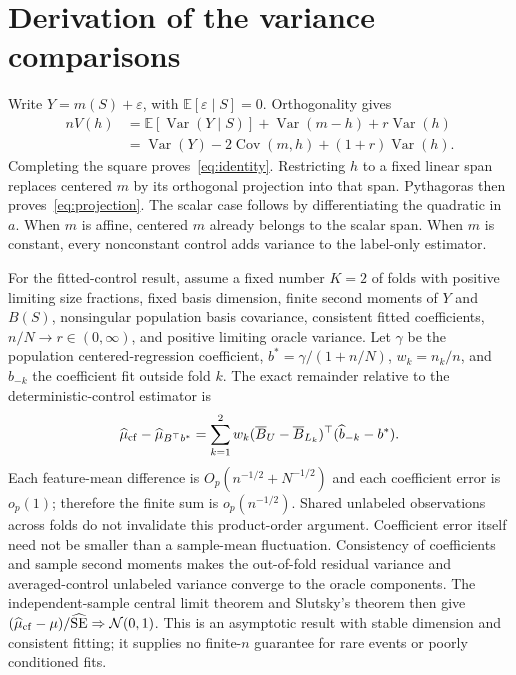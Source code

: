\appendix
\section{Derivation of the variance comparisons}
Write $Y=m(S)+\varepsilon$, with $\mathbb E[\varepsilon\mid S]=0$. Orthogonality gives
\begin{align*}
 nV(h)&=\mathbb E[\operatorname{Var}(Y\mid S)]
       +\operatorname{Var}(m-h)+r\operatorname{Var}(h)\\
 &=\operatorname{Var}(Y)-2\operatorname{Cov}(m,h)
       +(1+r)\operatorname{Var}(h).
\end{align*}
Completing the square proves~\eqref{eq:identity}. Restricting $h$ to a fixed linear span replaces centered $m$ by its orthogonal projection into that span. Pythagoras then proves~\eqref{eq:projection}. The scalar case follows by differentiating the quadratic in $a$. When $m$ is affine, centered $m$ already belongs to the scalar span. When $m$ is constant, every nonconstant control adds variance to the label-only estimator.

For the fitted-control result, assume a fixed number $K=2$ of folds with positive limiting size fractions, fixed basis dimension, finite second moments of $Y$ and $B(S)$, nonsingular population basis covariance, consistent fitted coefficients, $n/N\to r\in(0,\infty)$, and positive limiting oracle variance. Let $\gamma$ be the population centered-regression coefficient, $b^*=\gamma/(1+n/N)$, $w_k=n_k/n$, and $\widehat b_{-k}$ the coefficient fit outside fold $k$. The exact remainder relative to the deterministic-control estimator is
\[
 \widehat\mu_{\rm cf}-\widehat\mu_{B^\top b^*}
 =\sum_{k=1}^2 w_k(\overline B_U-\overline B_{L_k})^\top
             (\widehat b_{-k}-b^*).
\]
Each feature-mean difference is $O_p(n^{-1/2}+N^{-1/2})$ and each coefficient error is $o_p(1)$; therefore the finite sum is $o_p(n^{-1/2})$. Shared unlabeled observations across folds do not invalidate this product-order argument. Coefficient error itself need not be smaller than a sample-mean fluctuation. Consistency of coefficients and sample second moments makes the out-of-fold residual variance and averaged-control unlabeled variance converge to the oracle components. The independent-sample central limit theorem and Slutsky's theorem then give $(\widehat\mu_{\rm cf}-\mu)/\widehat{\rm SE}\Rightarrow\mathcal N(0,1)$. This is an asymptotic result with stable dimension and consistent fitting; it supplies no finite-$n$ guarantee for rare events or poorly conditioned fits.

